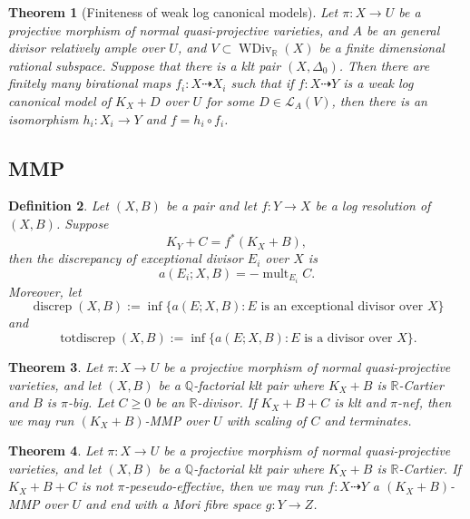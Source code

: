 \documentclass[11pt]{amsart}
\numberwithin{equation}{section}
\newtheorem{defn}{Definition}[subsection]
\newtheorem{thm}[defn]{Theorem}
\begin{document}
\begin{thm}[Finiteness of weak log canonical models]\label{finitewlcm}
\cite[Theorem E]{birkarExistenceMinimalModels2009}
   Let $\pi:X\to U$ be a projective morphism of normal quasi-projective varieties, and $A$ be an general divisor relatively ample over $U$, and $V \subset \operatorname{WDiv}_{\mathbb{R}}(X)$ be a finite dimensional rational subspace. Suppose that there is a klt pair $(X,\Delta_{0})$. Then there are finitely many birational maps $f_{i}:X \dashrightarrow X_{i}$ such that if $f:X \dashrightarrow  Y$ is a weak log canonical model of $K_{X}+D$ over $U$ for some $D \in \mathcal{L}_{A}(V)$, then there is an isomorphism  $h_{i}:X_{i} \to Y$  and $f=h_{i}\circ f_{i}$.  

\end{thm}


\subsection{MMP}
\begin{defn}
  Let $(X,B)$ be a pair  and let  $f:Y\to X$ be a log resolution of $(X,B)$. Suppose
  \[
  K_{Y}+C=f^*(K_{X}+B)
  ,\]
then the discrepancy  of exceptional divisor $E_{i}$ over $X$ is
\[
  a(E_{i};X,B)=-\operatorname{mult}_{E_{i}}C
.\]
 Moreover, let
\[
  \operatorname{discrep}(X, B) := \operatorname{inf}\{a(E; X, B) : E \text{ is an exceptional divisor over } X \}
\]
and
\[
  \operatorname{totdiscrep}(X, B) :=\operatorname{inf}\{a(E; X, B) : E \text{ is a divisor over } X\}.
\]
\end{defn}
\begin{thm}
\cite[Corollary 1.4.2]{birkarExistenceMinimalModels2009}Let $ \pi:X\to U $ be a projective morphism of normal quasi-projective varieties, and let $(X,B)$ be a $\mathbb{Q}$-factorial klt pair where $K_{X}+B$ is $\mathbb{R}$-Cartier and $B$ is $\pi$-big. Let $C\geqslant0$ be an $\mathbb{R}$-divisor. If $K_{X}+B+C$ is klt and  $\pi$-nef, then we may run $(K_{X}+B)$-MMP over $U$  with scaling of $C$ and  terminates.
\end{thm}
\begin{thm}\label{notpseudoeffmfs}
  \cite[Corollary 1.3.3]{birkarExistenceMinimalModels2009}Let $ \pi:X\to U $ be a projective morphism of normal quasi-projective varieties, and let $(X,B)$ be a $\mathbb{Q}$-factorial klt pair where $K_{X}+B$ is $\mathbb{R}$-Cartier.  If $K_{X}+B+C$ is  not $\pi$-peseudo-effective, then we may run $f:X\dashrightarrow Y$ a $(K_{X}+B)$-MMP over   $U$ and end with a Mori fibre space $g:Y\to Z$.
\end{thm}
\end{document}
